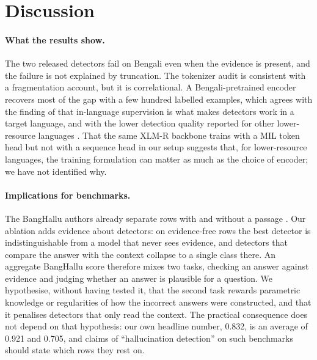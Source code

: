 \documentclass[manuscript,screen,review]{acmart}
\begin{document}
\section{Discussion}\label{sec:discussion}
\paragraph{What the results show.}
The two released detectors fail on Bengali even when the evidence is present, and the failure is not explained by truncation. The tokenizer audit is consistent with a fragmentation account, but it is correlational. A Bengali-pretrained encoder recovers most of the gap with a few hundred labelled examples, which agrees with the finding of \citet{datta2026lowresource} that in-language supervision is what makes detectors work in a target language, and with the lower detection quality reported for other lower-resource languages \cite{ralethe2026multihallsa,abdaljalil2026halluverse}. That the same XLM-R backbone trains with a MIL token head but not with a sequence head in our setup suggests that, for lower-resource languages, the training formulation can matter as much as the choice of encoder; we have not identified why.

\paragraph{Implications for benchmarks.}
The BangHallu authors already separate rows with and without a passage \cite{banghalluRepo}. Our ablation adds evidence about detectors: on evidence-free rows the best detector is indistinguishable from a model that never sees evidence, and detectors that compare the answer with the context collapse to a single class there. An aggregate BangHallu score therefore mixes two tasks, checking an answer against evidence and judging whether an answer is plausible for a question. We hypothesise, without having tested it, that the second task rewards parametric knowledge or regularities of how the incorrect answers were constructed, and that it penalises detectors that only read the context. The practical consequence does not depend on that hypothesis: our own headline number, 0.832, is an average of 0.921 and 0.705, and claims of ``hallucination detection'' on such benchmarks should state which rows they rest on.
\end{document}
